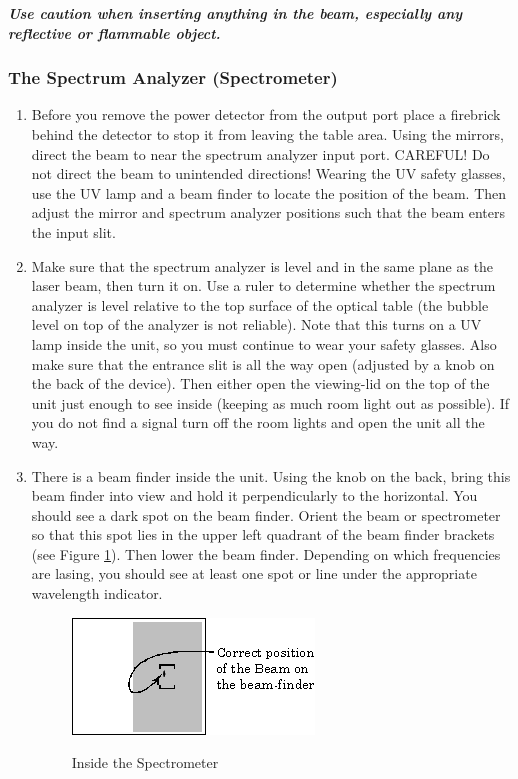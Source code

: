 \documentclass{../lab}
\begin{document}
\emph{\textbf{Use caution when inserting anything in the beam, especially any reflective or flammable object.}}

\subsubsection{The Spectrum Analyzer (Spectrometer)}

\begin{enumerate}
    \item Before you remove the power detector from the output port place a firebrick behind the detector to stop it from leaving the table area. Using the mirrors, direct the beam to near the spectrum analyzer input port. CAREFUL! Do not direct the beam to unintended directions! Wearing the UV safety glasses, use the UV lamp and a beam finder to locate the position of the beam. Then adjust the mirror and spectrum analyzer positions such that the beam enters the input slit.

    \item Make sure that the spectrum analyzer is level and in the same plane as the laser beam, then turn it on. Use a ruler to determine whether the spectrum analyzer is level relative to the top surface of the optical table (the bubble level on top of the analyzer is not reliable). Note that this turns on a UV lamp inside the unit, so you must continue to wear your safety glasses. Also make sure that the entrance slit is all the way open (adjusted by a knob on the back of the device). Then either open the viewing-lid on the top of the unit just enough to see inside (keeping as much room light out as possible). If you do not find a signal turn off the room lights and open the unit all the way.

    \item There is a beam finder inside the unit. Using the knob on the back, bring this beam finder into view and hold it perpendicularly to the horizontal. You should see a dark spot on the beam finder. Orient the beam or spectrometer so that this spot lies in the upper left quadrant of the beam finder brackets (see Figure \ref{fig:InsideTheSpectrometer}). Then lower the beam finder. Depending on which frequencies are lasing, you should see at least one spot or line under the appropriate wavelength indicator.
    \begin{figure}[h]
        \centering
        \href{http://experimentationlab.berkeley.edu/sites/default/files/images/CO26.gif}{\includegraphics[width=0.5\linewidth]{images/CO26.png}}
        \caption{Inside the Spectrometer}
        \label{fig:InsideTheSpectrometer}
    \end{figure}
    

\end{enumerate}
\end{document}
